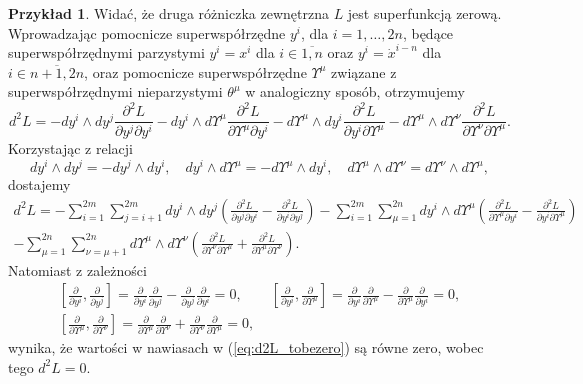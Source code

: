 \documentclass[11pt,a4paper]{report}
\theoremstyle{definition}
\newtheorem{example}[theorem]{Przykład}
\begin{document}
\begin{example}
Widać, że druga różniczka zewnętrzna $L$ jest superfunkcją zerową. Wprowadzając pomocnicze superwspółrzędne $y^i$, dla $i=1,\ldots,2n$, będące superwspółrzędnymi parzystymi $y^i=x^i$ dla $i \in \overline{1,n}$ oraz $y^i=\dot x^{i-n}$ dla $i \in \overline{n+1, 2n}$, oraz pomocnicze superwspółrzędne $\Upsilon^\mu$ związane z superwspółrzędnymi nieparzystymi $\theta^\mu$ w analogiczny sposób, otrzymujemy 
\begin{equation*}
d^2 L =-dy^i\wedge dy^j\frac{\partial^2 L}{\partial y^j \partial y^i} - dy^i\wedge d\Upsilon^\mu \frac{\partial^2 L}{\partial \Upsilon^\mu \partial y^i} - d\Upsilon^\mu \wedge dy^i\frac{\partial^2 L}{\partial y^i \partial \Upsilon^\mu} - d\Upsilon^\mu \wedge d\Upsilon^\nu \frac{\partial^2 L}{\partial \Upsilon^\nu \partial \Upsilon^\mu}.
\end{equation*}
Korzystając z relacji
\begin{equation*}
dy^i\wedge dy^j=-dy^j\wedge dy^i,\quad dy^i\wedge d\Upsilon^\mu = -d\Upsilon^\mu \wedge dy^i,\quad d\Upsilon^\mu \wedge d\Upsilon^\nu = d\Upsilon^\nu \wedge d\Upsilon^\mu,
\end{equation*}
dostajemy
\begin{multline}
\label{eq:d2L_tobezero}
d^2 L= - \sum_{i=1}^{2m} \sum_{j=i+1}^{2m} dy^i\wedge dy^j\left(\frac{\partial^2 L}{\partial y^j\partial y^i}-\frac{\partial^2 L}{\partial y^i\partial y^j}\right)
-\sum_{i=1}^{2m} \sum_{\mu = 1}^{2n} dy^i\wedge d\Upsilon^\mu\left( \frac{\partial^2 L}{\partial \Upsilon^\mu\partial y^i} - \frac{\partial^2 L}{\partial y^i\partial \Upsilon^\mu}\right)\\
-\sum_{\mu=1}^{2n} \sum_{\nu=\mu+1}^{2n} d\Upsilon^\mu\wedge d\Upsilon^\nu\left(\frac{\partial^2 L}{\partial\Upsilon^\nu\partial \Upsilon^\mu}+\frac{\partial^2 L}{\partial\Upsilon^\mu\partial \Upsilon^\nu}\right).
\end{multline}
Natomiast z zależności
\begin{equation*}
\begin{gathered}
\left[\frac{\partial }{\partial y^i},\frac{\partial }{\partial y^j}\right]=\frac{\partial }{\partial y^i}\frac{\partial }{\partial y^j}-\frac{\partial }{\partial y^j}\frac{\partial }{\partial y^i}=0,\qquad
\left[\frac{\partial }{\partial y^i},\frac{\partial }{\partial \Upsilon^\mu}\right]=\frac{\partial }{\partial y^i}\frac{\partial }{\partial  \Upsilon^\mu}-\frac{\partial }{\partial  \Upsilon^\mu}\frac{\partial }{\partial y^i}=0, \\
\left[\frac{\partial }{\partial \Upsilon^\mu},\frac{\partial }{\partial \Upsilon^\nu}\right]=\frac{\partial }{\partial \Upsilon^\mu}\frac{\partial }{\partial  \Upsilon^\nu}+\frac{\partial }{\partial  \Upsilon^\nu}\frac{\partial }{\partial \Upsilon^\mu}=0,
\end{gathered}
\end{equation*}
wynika, że wartości w nawiasach w (\ref{eq:d2L_tobezero}) są równe zero, wobec tego $d^2L = 0.$
\end{example} 
\end{document}

